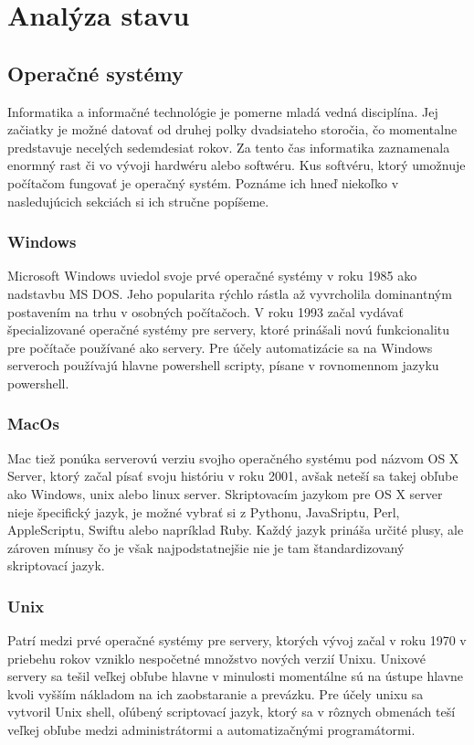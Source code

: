 \section{Analýza stavu}
\subsection{Operačné systémy}
\indent Informatika a informačné technológie je pomerne mladá vedná disciplína. Jej začiatky je možné datovať od druhej polky dvadsiateho storočia, čo momentalne predstavuje necelých sedemdesiat rokov. Za tento čas informatika zaznamenala enormný rast či vo vývoji hardwéru alebo softwéru. Kus softvéru, ktorý umožnuje počítačom fungovať je operačný systém. Poznáme ich hneď niekoľko v nasledujúcich sekciách si ich stručne popíšeme.
\subsubsection{Windows}
\indent Microsoft Windows uviedol svoje prvé operačné systémy v roku 1985 ako nadstavbu MS DOS. Jeho popularita rýchlo rástla až vyvrcholila dominantným postavením na trhu v osobných počítačoch. V roku 1993 začal vydávať špecializované operačné systémy pre servery, ktoré prinášali novú funkcionalitu pre počítače používané ako servery. Pre účely automatizácie sa na Windows serveroch používajú hlavne powershell scripty, písane v rovnomennom jazyku powershell.
\newline
\subsubsection{MacOs}
\indent  Mac tiež ponúka serverovú verziu svojho operačného systému pod názvom OS X Server, ktorý začal písať svoju históriu v roku 2001, avšak neteší sa takej obľube ako Windows, unix alebo linux server. Skriptovacím jazykom pre OS X server nieje špecifický jazyk, je možné vybrať si z Pythonu, JavaSriptu, Perl, AppleScriptu, Swiftu alebo napríklad Ruby. Každý jazyk prináša určité plusy, ale zároven mínusy čo je však najpodstatnejšie nie je tam štandardizovaný skriptovací jazyk.
\newline
\subsubsection{Unix}
\indent Patrí medzi prvé operačné systémy pre servery, ktorých vývoj začal v roku 1970 v priebehu rokov vzniklo nespočetné množstvo nových verzií Unixu. Unixové servery sa tešil veľkej obľube hlavne v minulosti momentálne sú na ústupe hlavne kvoli vyšším nákladom na ich zaobstaranie a prevázku. Pre účely unixu sa vytvoril Unix shell, oľúbený scriptovací jazyk, ktorý sa v rôznych obmenách teší veľkej obľube medzi administrátormi a automatizačnými programátormi.
\newline
